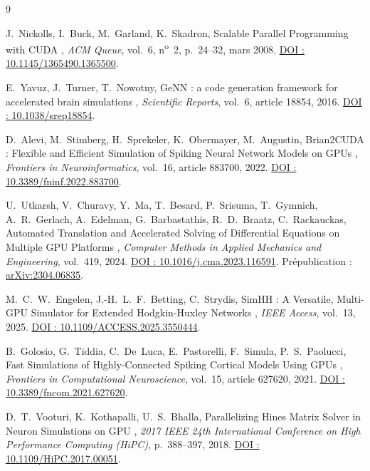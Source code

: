 \documentclass{report}
\begin{document}
\begin{thebibliography}{9}

 J.~Nickolls, I.~Buck, M.~Garland, K.~Skadron, \og Scalable Parallel Programming with CUDA \fg, \emph{ACM Queue}, vol.~6, n\textsuperscript{o}~2, p.~24--32, mars 2008. \href{https://doi.org/10.1145/1365490.1365500}{DOI : 10.1145/1365490.1365500}.

 E.~Yavuz, J.~Turner, T.~Nowotny, \og GeNN : a code generation framework for accelerated brain simulations \fg, \emph{Scientific Reports}, vol.~6, article 18854, 2016. \href{https://doi.org/10.1038/srep18854}{DOI : 10.1038/srep18854}.

 D.~Alevi, M.~Stimberg, H.~Sprekeler, K.~Obermayer, M.~Augustin, \og Brian2CUDA : Flexible and Efficient Simulation of Spiking Neural Network Models on GPUs \fg, \emph{Frontiers in Neuroinformatics}, vol.~16, article 883700, 2022. \href{https://doi.org/10.3389/fninf.2022.883700}{DOI : 10.3389/fninf.2022.883700}.

 U.~Utkarsh, V.~Churavy, Y.~Ma, T.~Besard, P.~Srisuma, T.~Gymnich, A.~R.~Gerlach, A.~Edelman, G.~Barbastathis, R.~D.~Braatz, C.~Rackauckas, \og Automated Translation and Accelerated Solving of Differential Equations on Multiple GPU Platforms \fg, \emph{Computer Methods in Applied Mechanics and Engineering}, vol.~419, 2024. \href{https://doi.org/10.1016/j.cma.2023.116591}{DOI : 10.1016/j.cma.2023.116591}. Prépublication : \href{https://arxiv.org/abs/2304.06835}{arXiv:2304.06835}.

 M.~C.~W.~Engelen, J.-H.~L.~F.~Betting, C.~Strydis, \og SimHH : A Versatile, Multi-GPU Simulator for Extended Hodgkin-Huxley Networks \fg, \emph{IEEE Access}, vol.~13, 2025. \href{https://doi.org/10.1109/ACCESS.2025.3550444}{DOI : 10.1109/ACCESS.2025.3550444}.

 B.~Golosio, G.~Tiddia, C.~De~Luca, E.~Pastorelli, F.~Simula, P.~S.~Paolucci, \og Fast Simulations of Highly-Connected Spiking Cortical Models Using GPUs \fg, \emph{Frontiers in Computational Neuroscience}, vol.~15, article 627620, 2021. \href{https://doi.org/10.3389/fncom.2021.627620}{DOI : 10.3389/fncom.2021.627620}.

 D.~T.~Vooturi, K.~Kothapalli, U.~S.~Bhalla, \og Parallelizing Hines Matrix Solver in Neuron Simulations on GPU \fg, \emph{2017 IEEE 24th International Conference on High Performance Computing (HiPC)}, p.~388--397, 2018. \href{https://doi.org/10.1109/HiPC.2017.00051}{DOI : 10.1109/HiPC.2017.00051}.


\end{thebibliography}
\end{document}
